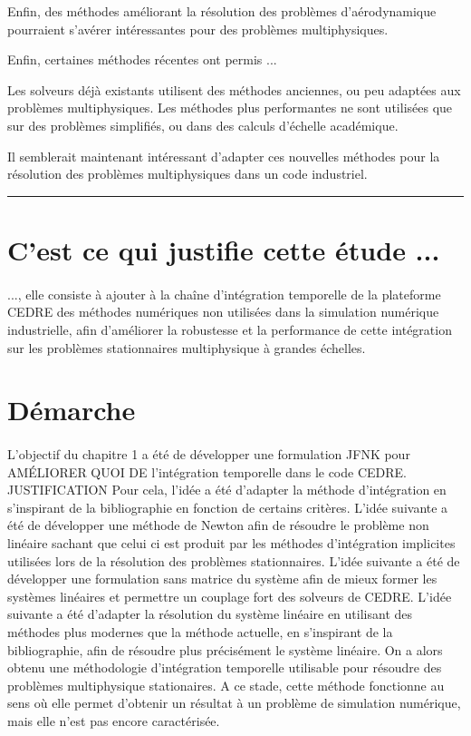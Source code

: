    Enfin, des méthodes améliorant la résolution des problèmes d'aérodynamique pourraient s'avérer intéressantes pour des problèmes multiphysiques.

    Enfin, certaines méthodes récentes ont permis ...

    Les solveurs déjà existants utilisent des méthodes anciennes, ou peu adaptées aux problèmes multiphysiques.
    Les méthodes plus performantes ne sont utilisées que sur des problèmes simplifiés, ou dans des calculs d'échelle académique.

    Il semblerait maintenant intéressant d'adapter ces nouvelles méthodes pour la résolution des problèmes multiphysiques dans un code industriel.

    \vspace{1cm}\hrule\vspace{1cm}

  \section*{C'est ce qui justifie cette étude ...}

    \paragraph{}
    ..., elle consiste à ajouter à la chaîne d'intégration temporelle de la plateforme CEDRE des méthodes numériques non utilisées dans la simulation numérique industrielle,
    afin d'améliorer la robustesse et la performance de cette intégration sur les problèmes stationnaires multiphysique à grandes échelles.


  \section*{Démarche}

    \paragraph{}
    L'objectif du chapitre 1 a été de développer une formulation JFNK pour AMÉLIORER QUOI DE l'intégration temporelle dans le code CEDRE.
    JUSTIFICATION
    Pour cela, l'idée a été d'adapter la méthode d'intégration en s'inspirant de la bibliographie en fonction de certains critères.
    L'idée suivante a été de développer une méthode de Newton afin de résoudre le problème non linéaire sachant que celui ci est produit par les méthodes d'intégration implicites utilisées lors de la résolution des problèmes stationnaires.
    L'idée suivante a été de développer une formulation sans matrice du système afin de mieux former les systèmes linéaires et permettre un couplage fort des solveurs de CEDRE.
    L'idée suivante a été d'adapter la résolution du système linéaire en utilisant des méthodes plus modernes que la méthode actuelle, en s'inspirant de la bibliographie, afin de résoudre plus précisément le système linéaire.
    On a alors obtenu une méthodologie d'intégration temporelle utilisable pour résoudre des problèmes multiphysique stationaires.
    A ce stade, cette méthode fonctionne au sens où elle permet d'obtenir un résultat à un problème de simulation numérique, mais elle n'est pas encore caractérisée.

